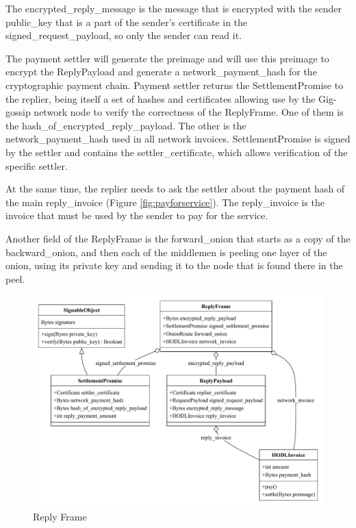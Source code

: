 \documentclass{article}
\begin{document}
The encrypted\_reply\_message is the message that is encrypted with the sender public\_key that is a part of the sender's certificate in the signed\_request\_payload, so only the sender can read it.

The payment settler will generate the preimage and will use this preimage to encrypt the ReplyPayload and generate a network\_payment\_hash for the cryptographic payment chain. Payment settler returns the SettlementPromise to the replier, being itself a set of hashes and certificates allowing use by the Gig-gossip network node to verify the correctness of the ReplyFrame. One of them is the hash\_of\_encrypted\_reply\_payload. The other is the network\_payment\_hash used in all network invoices. SettlementPromise is signed by the settler and contains the settler\_certificate, which allows verification of the specific settler.

At the same time, the replier needs to ask the settler about the payment hash of the main reply\_invoice (Figure \ref{fig:payforservice}). The reply\_invoice is the invoice that must be used by the sender to pay for the service. 

Another field of the ReplyFrame is the forward\_onion that starts as a copy of the backward\_onion, and then each of the middlemen is peeling one layer of the onion, using its private key and sending it to the node that is found there in the peel.

\begin{figure}
	\centering
	\includegraphics[scale=0.7]{ReplyFrame.pdf}
	\caption{Reply Frame}
	\label{fig:fr:replyframe}
\end{figure}
\end{document}
